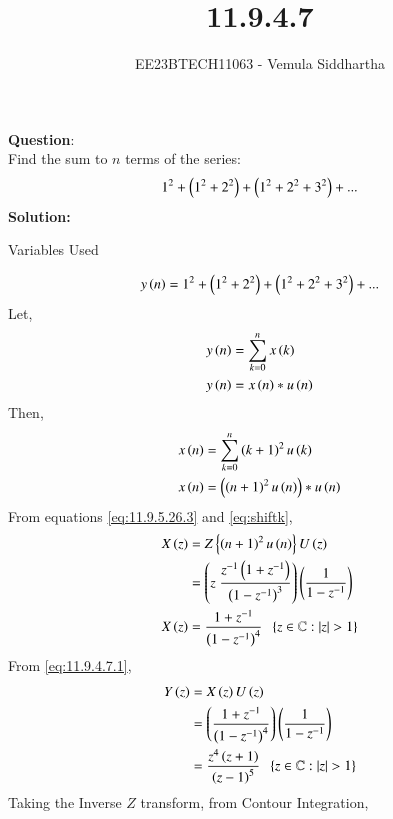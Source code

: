 \documentclass[journal,12pt,twocolumn]{IEEEtran}
\theoremstyle{remark}
\begin{document}

\vspace{3cm}

\title{11.9.4.7}
\author{EE23BTECH11063 - Vemula Siddhartha
}
\maketitle
\newpage
\bigskip

\renewcommand{\thefigure}{\theenumi}
\renewcommand{\thetable}{\theenumi}
\textbf{Question}:\\
Find the sum to $n$ terms of the series:
\begin{align*}
    1^2+\left(1^2+2^2\right)+\left(1^2+2^2+3^2\right)+...
\end{align*}
\textbf{Solution:}
\begin{table}[h!]    
    \centering
    
    \caption{Variables Used}
    \label{tab10.5.3.9.1}
  \end{table}
\begin{align}
    y\left(n\right)&=1^2+\left(1^2+2^2\right)+\left(1^2+2^2+3^2\right)+...\\
\end{align}
Let,
\begin{align}
    y\left(n\right)&=\sum_{k=0}^{n}x\left(k\right)\\
    y\left(n\right)&=x\left(n\right)*u\left(n\right)\label{eq:11.9.4.7.1}
\end{align}
Then,
\begin{align}
    x\left(n\right)&=\sum_{k=0}^{n}\left(k+1\right)^2u\left(k\right)\\
    x\left(n\right)&=\left(\left(n+1\right)^2u\left(n\right)\right)*u\left(n\right)
\end{align}
From equations \eqref{eq:11.9.5.26.3} and \eqref{eq:shiftk},
\begin{align}
    X\brak{z}&=Z\cbrak{\brak{n+1}^2u\brak{n}}U\brak{z}\\
    &=\brak{z\;\frac{z^{-1}\brak{1+z^{-1}}}{\brak{1-z^{-1}}^3}}\brak{\frac{1}{1-z^{-1}}}\\
    X\brak{z}&=\frac{1+z^{-1}}{\brak{1-z^{-1}}^4}\;\;\cbrak{z\in\mathbb{C}: |z|>1}
\end{align}
From \eqref{eq:11.9.4.7.1},
\begin{align}
    Y\brak{z}&=X\brak{z}U\brak{z}\\
    &=\brak{\frac{1+z^{-1}}{\brak{1-z^{-1}}^4}}\brak{\frac{1}{1-z^{-1}}}\\
    &=\frac{z^4\brak{z+1}}{\brak{z-1}^5}\;\;\cbrak{z\in\mathbb{C}: |z|>1}
\end{align}
Taking the Inverse $Z$ transform, from Contour Integration,
\end{document}
